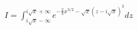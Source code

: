\documentclass[preview]{standalone}
\begin{document}
\begin{align*}
I=\displaystyle \int_{i\sqrt{x}-\infty}^{i\sqrt{x}+\infty}e^{-\frac{2}{3}x^{3/2}-\sqrt{x}(z-i\sqrt{x})^2}dz
\end{align*}
\end{document}
